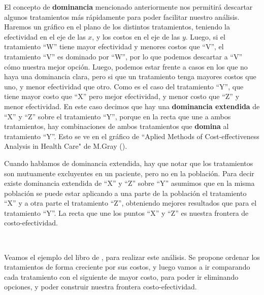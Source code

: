 \documentclass[12pt]{article}
\begin{document}
El concepto de \textbf{dominancia} mencionado anteriormente nos permitirá descartar algunos tratamientos más rápidamente para poder facilitar nuestro análisis. Haremos un gráfico en el plano de los distintos tratamientos, teniendo la efectividad en el eje de las $x$, y los costos en el eje de las $y$. Luego, si el tratamiento ``W'' tiene mayor efectividad y menores costos que ``V'', el tratamiento ``V'' es dominado por ``W'', por lo que podemos descartar a ``V'' cómo nuestra mejor opción. Luego, podemos estar frente a casos en los que no haya una dominancia clara, pero si que un tratamiento tenga mayores costos que uno, y menor efectividad que otro. Como es el caso del tratamiento ``Y'', que tiene mayor costo que ``X'' pero mejor efectividad, y menor costo que ``Z'' y menor efectividad. En este caso decimos que hay una \textbf{dominancia extendida} de ``X'' y ``Z'' sobre el tratamiento ``Y'', porque en la recta que une a ambos tratamientos, hay combinaciones de ambos tratamientos que \textbf{domina} al tratamiento ``Y''. Esto se ve en el gráfico de ``Aplied Methods of Cost-effectiveness Analysis in Health Care" de M.Gray (\cite{gray_applied_2011}).\

Cuando hablamos de dominancia extendida, hay que notar que los tratamientos son mutuamente excluyentes en un paciente, pero no en la población. Para decir existe dominancia extendida de ``X'' y ``Z'' sobre ``Y'' asumimos que en la misma población se puede estar aplicando a una parte de la población el tratamiento ``X'' y a otra parte el tratamiento ``Z'', obteniendo mejores resultados que para el tratamiento ``Y''. La recta que une los puntos ``X'' y ``Z'' es nuestra frontera de costo-efectividad.

\

Veamos el ejemplo del libro de \cite{gray_applied_2011}, para realizar este análisis. Se propone ordenar los tratamientos de forma creciente por sus costos, y luego vamos a ir comparando cada tratamiento con el siguiente de mayor costo, para poder ir eliminando opciones, y poder construir nuestra frontera costo-efectividad.
\end{document}
